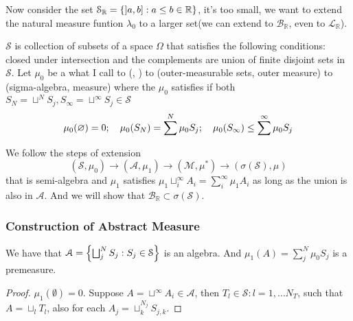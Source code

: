 Now consider the set \(\mathcal{S}_{\mathbb{R}} = \Bqty{\linterval{a}{b} : a\leq b \in \mathbb{R}}\), it's too small, we want to extend the natural measure funtion \(\lambda_{0}\) to a larger set(we can extend to \(\mathcal{B}_{\mathbb{R}}\), even to \(\mathcal{L}_{\mathbb{R}}\)). 


 \(\mathcal{S}\) is collection of subsets of a space \(\Omega\) that satisfies the following conditions: closed under intersection and the complements are union of finite disjoint sets in \(\mathcal{S}\). Let \(\mu_{0}\) be a what I call  to ({, }) to (outer-measurable sets, outer measure) to ({sigma-algebra, measure}) where the  \(\mu_{0}\) satisfies if both \(S_{N} = \sqcup^{N}S_{j}, S_{\infty} = \sqcup^{\infty}S_{j} \in \mathcal{S}\)
\begin{equation*}
    \mu_{0}(\emptyset) = 0 ; \quad \mu_{0}\pqty{S_{N}} = \sum^{N} \mu_{0}S_{j}; \quad  \mu_{0}\pqty{S_{\infty}} \leq \sum^{\infty} \mu_{0}S_{j}
\end{equation*} 

We follow the steps of extension
\begin{equation*}
    (\mathcal{S}, \mu_{0}) \to (\mathcal{A}, \mu_{1}) \to (\mathcal{M}, \mu^{*}) \to (\sigma(\mathcal{S}), \mu)
\end{equation*}
that is semi-algebra and 
 \(\mu_{1}\) satisfies \(\mu_{1}\sqcup_{i}^{\infty} A_{i} = \sum_{i}^{\infty} \mu_{1} A_{i}\) as long as the union is also in \(\mathcal{A}\). And we will show that \(\mathcal{B}_{\mathbb{R}} \subset \sigma(\mathcal{S})\). 

\subsubsection{Construction of Abstract Measure}

\begin{thm}
    We have that \(\mathcal{A} = \Bqty{\bigsqcup^{N}_{j} S_{j} : S_{j} \in \mathcal{S}}\) is an algebra. And \(\mu_{1}(A) = \sum^{N}_{j} \mu_{0} S_{j}\) is a premeasure. 
\end{thm}

\begin{proof}
    \(\mu_{1}(\emptyset) = 0\). Suppose \(A = \sqcup^{\infty} A_{i} \in \mathcal{A}\), then  \(T_{l}\in \mathcal{S}: l = 1,\dots N_T\), such that \(A = \sqcup_{l} T_{l}\), also for each \(A_{j} = \sqcup^{N_{j}}_{k} S_{j,k}\). 
\end{proof}

